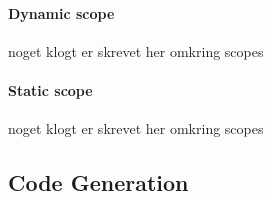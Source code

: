     \paragraph{Dynamic scope} noget klogt er skrevet her omkring scopes
    
    \paragraph{Static scope} noget klogt er skrevet her omkring scopes

    
    


\subsection{Code Generation}
